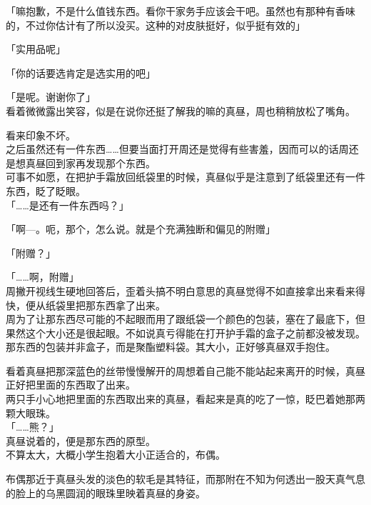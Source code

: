 「嘛抱歉，不是什么值钱东西。看你干家务手应该会干吧。虽然也有那种有香味的，不过你估计有了所以没买。这种的对皮肤挺好，似乎挺有效的」

「实用品呢」

「你的话要选肯定是选实用的吧」

「是呢。谢谢你了」\\

看着微微露出笑容，似是在说你还挺了解我的嘛的真昼，周也稍稍放松了嘴角。

看来印象不坏。\\

之后虽然还有一件东西……但要当面打开周还是觉得有些害羞，因而可以的话周还是想真昼回到家再发现那个东西。\\

可事不如愿，在把护手霜放回纸袋里的时候，真昼似乎是注意到了纸袋里还有一件东西，眨了眨眼。\\

「……是还有一件东西吗？」

「啊—。呃，那个，怎么说。就是个充满独断和偏见的附赠」

「附赠？」

「……啊，附赠」\\

周撇开视线生硬地回答后，歪着头搞不明白意思的真昼觉得不如直接拿出来看来得快，便从纸袋里把那东西拿了出来。\\

周为了让那东西尽可能的不起眼而用了跟纸袋一个颜色的包装，塞在了最底下，但果然这个大小还是很起眼。不如说真亏得能在打开护手霜的盒子之前都没被发现。\\

那东西的包装并非盒子，而是聚酯塑料袋。其大小，正好够真昼双手抱住。

看着真昼把那深蓝色的丝带慢慢解开的周想着自己能不能站起来离开的时候，真昼正好把里面的东西取了出来。\\

两只手小心地把里面的东西取出来的真昼，看起来是真的吃了一惊，眨巴着她那两颗大眼珠。\\

「……熊？」\\

真昼说着的，便是那东西的原型。\\

不算太大，大概小学生抱着大小正适合的，布偶。

布偶那近于真昼头发的淡色的软毛是其特征，而那附在不知为何透出一股天真气息的脸上的乌黑圆润的眼珠里映着真昼的身姿。\\

